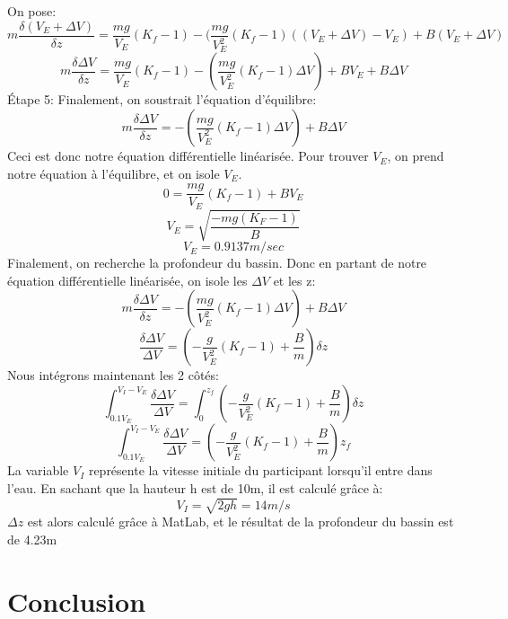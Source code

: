 \documentclass[12pt]{article}
\begin{document}
On pose: 
\begin{equation}
m\frac{\delta (V_E + \Delta V)}{\delta z} = \frac{mg}{V_E}(K_f-1) - (\frac{mg}{V_E^2}(K_f-1)((V_E + \Delta V)-V_E)+B(V_E + \Delta V)
\end{equation}
\begin{equation}
m\frac{\delta \Delta V}{\delta z} = \frac{mg}{V_E}(K_f-1) - (\frac{mg}{V_E^2}(K_f-1) \Delta V)+BV_E + B\Delta V
\end{equation}
Étape 5: Finalement, on soustrait l'équation d'équilibre:
\begin{equation}
m\frac{\delta \Delta V}{\delta z} = - (\frac{mg}{V_E^2}(K_f-1) \Delta V)+ B\Delta V
\end{equation}
Ceci est donc notre équation différentielle linéarisée.
\newline
\newline
Pour trouver $V_E$, on prend notre équation à l'équilibre, et on isole $V_E$.
\begin{equation}
0 = \frac{mg}{V_E}(K_f-1)+BV_E
\end{equation}
\begin{equation}
V_E = \sqrt{\frac{-mg(K_F-1)}{B}}
\end{equation} 
\begin{equation}
V_E = 0.9137m/sec
\end{equation}  
Finalement, on recherche la profondeur du bassin. Donc en partant de notre équation différentielle linéarisée, on isole les $\Delta V$ et les z: 
\begin{equation}
m\frac{\delta \Delta V}{\delta z} = - (\frac{mg}{V_E^2}(K_f-1) \Delta V)+ B\Delta V
\end{equation}
\begin{equation}
\frac{\delta \Delta V}{\Delta V} =  (-\frac{g}{V_E^2}(K_f-1)+ \frac{B}{m})\delta z
\end{equation}
Nous intégrons maintenant les 2 côtés:
\begin{equation}
\int_{0.1V_E}^{V_I-V_E}\frac{\delta \Delta V}{\Delta V} = \int_{0}^{z_f} (-\frac{g}{V_E^2}(K_f-1)+ \frac{B}{m})\delta z
\end{equation}
\begin{equation}
\int_{0.1V_E}^{V_I-V_E}\frac{\delta \Delta V}{\Delta V} = (-\frac{g}{V_E^2}(K_f-1)+ \frac{B}{m})z_f
\end{equation}
La variable $V_I$ représente la vitesse initiale du participant lorsqu'il entre dans l'eau. En sachant que la hauteur h est de 10m, il est calculé grâce à:
\begin{equation}
V_I = \sqrt{2gh}=14 m/s
\end{equation}
$\Delta z$ est alors calculé grâce à MatLab, et le résultat de la profondeur du bassin est de 4.23m
\section{Conclusion}
\end{document}
